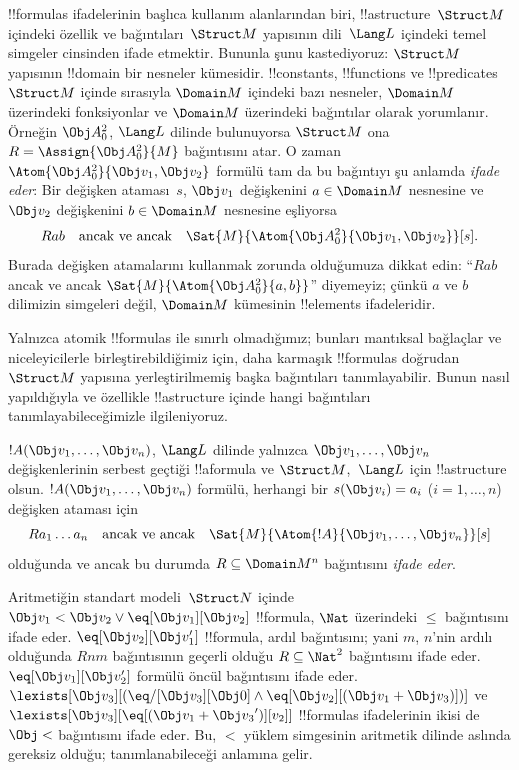 \documentclass[../../../include/open-logic-section]{subfiles}
\begin{document}


\begin{explain}
!!{formula}s ifadelerinin başlıca kullanım alanlarından biri,
!!a{structure}~$\Struct M$ içindeki özellik ve bağıntıları~$\Struct
M$ yapısının dili~$\Lang L$ içindeki temel simgeler cinsinden ifade
etmektir. Bununla şunu kastediyoruz: $\Struct M$ yapısının !!{domain}
bir nesneler kümesidir. !!{constant}s, !!{function}s ve !!{predicate}s
$\Struct M$ içinde sırasıyla $\Domain M$ içindeki bazı nesneler,
$\Domain M$ üzerindeki fonksiyonlar ve $\Domain M$ üzerindeki
bağıntılar olarak yorumlanır. Örneğin $\Obj A^2_0$, $\Lang L$ dilinde
bulunuyorsa $\Struct M$ ona $R=\Assign{{\Obj A^2_0}}{M}$ bağıntısını
atar. O zaman $\Atom{\Obj A^2_0}{\Obj v_1,\Obj v_2}$ formülü tam da
bu bağıntıyı şu anlamda \emph{ifade eder}: Bir değişken ataması~$s$,
$\Obj v_1$ değişkenini $a\in\Domain M$ nesnesine ve $\Obj v_2$
değişkenini $b\in\Domain M$ nesnesine eşliyorsa
\[
Rab \text{\quad ancak ve ancak\quad}
\Sat{M}{\Atom{\Obj A^2_0}{\Obj v_1, \Obj v_2}}[s].
\]
Burada değişken atamalarını kullanmak zorunda olduğumuza dikkat edin:
``$Rab$ ancak ve ancak $\Sat{M}{\Atom{\Obj A^2_0}{a,b}}$''
diyemeyiz; çünkü $a$ ve $b$ dilimizin simgeleri değil,
$\Domain M$ kümesinin !!{element}s ifadeleridir.

Yalnızca atomik !!{formula}s ile sınırlı olmadığımız; bunları mantıksal
bağlaçlar ve niceleyicilerle birleştirebildiğimiz için, daha karmaşık
!!{formula}s doğrudan $\Struct M$ yapısına yerleştirilmemiş başka
bağıntıları tanımlayabilir. Bunun nasıl yapıldığıyla ve özellikle
!!a{structure} içinde hangi bağıntıları tanımlayabileceğimizle
ilgileniyoruz.
\end{explain}

\begin{defn}
$!A(\Obj v_1,\dots,\Obj v_n)$, $\Lang L$ dilinde yalnızca
$\Obj v_1,\dots,\Obj v_n$ değişkenlerinin serbest geçtiği !!a{formula}
ve $\Struct M$,~$\Lang L$ için !!a{structure} olsun.
$!A(\Obj v_1,\dots,\Obj v_n)$ formülü, herhangi bir $s(\Obj v_i)=a_i$
($i=1,\dots,n$) değişken ataması için
\[
Ra_1\dots a_n \text{\quad ancak ve ancak\quad}
\Sat{M}{\Atom{!A}{\Obj v_1,\dots, \Obj v_n}}[s]
\]
olduğunda ve ancak bu durumda $R\subseteq\Domain M^n$ bağıntısını
\emph{ifade eder}.
\end{defn}

\begin{ex}
Aritmetiğin standart modeli~$\Struct N$ içinde $\Obj v_1<\Obj v_2
\lor\eq[\Obj v_1][\Obj v_2]$ !!{formula}, $\Nat$ üzerindeki $\le$
bağıntısını ifade eder. $\eq[\Obj v_2][\Obj v_1']$ !!{formula}, ardıl
bağıntısını; yani $m$, $n$'nin ardılı olduğunda $Rnm$ bağıntısının
geçerli olduğu $R\subseteq\Nat^2$ bağıntısını ifade eder.
$\eq[\Obj v_1][\Obj v_2']$ formülü öncül bağıntısını ifade eder.
$\lexists[\Obj v_3][(\eq/[\Obj v_3][\Obj 0]\land
\eq[\Obj v_2][(\Obj v_1+\Obj v_3)])]$ ve
$\lexists[\Obj v_3][\eq[(\Obj v_1+{\Obj v_3}')][v_2]]$
!!{formula}s ifadelerinin ikisi de $\Obj <$ bağıntısını ifade eder.
Bu, $<$ yüklem simgesinin aritmetik dilinde aslında gereksiz olduğu;
tanımlanabileceği anlamına gelir.
\end{ex}
\end{document}
